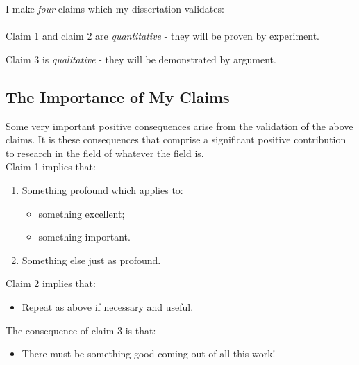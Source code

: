 I make \textit{four} claims which
my dissertation validates:
\\

\\

\noindent Claim 1 and claim 2 are \textit{quantitative} - they will be proven by experiment.

\noindent Claim 3 is \textit{qualitative} - they will be demonstrated by argument.

\subsection{The Importance of My Claims}

Some very important positive consequences
arise from the validation of the above claims.
It is these consequences that comprise a significant
positive contribution to research in the field
of whatever the field is.
\\

\noindent Claim 1 implies that:
\begin{enumerate}
\item{Something profound which applies to:
	\begin{itemize}
	\item {something excellent;}
	\item {something important.}
	\end{itemize}}
\item{Something else just as profound.}
\end{enumerate}

\noindent Claim 2 implies that:
\begin{itemize}
\item{Repeat as above if necessary and useful.}
\end{itemize}

\noindent The consequence of claim 3 is that:
\begin{itemize}
\item{There must be something good coming out of all this work!}
\end{itemize}

